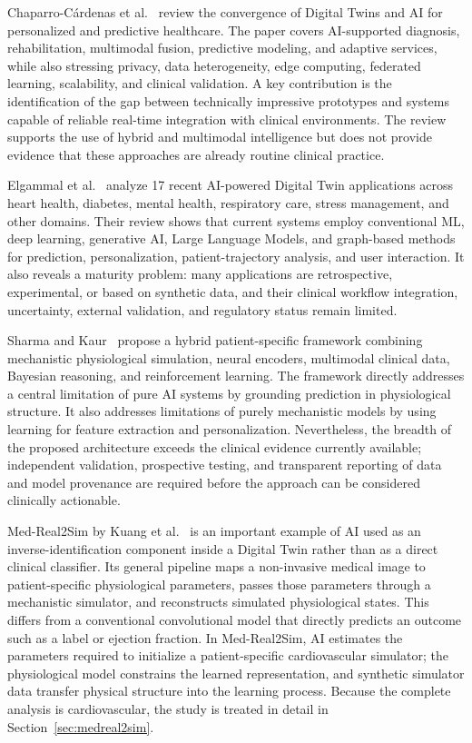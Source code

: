 Chaparro-C\'ardenas et al.~\cite{chaparro2025technological} review the convergence of Digital Twins and AI for personalized and predictive healthcare. The paper covers AI-supported diagnosis, rehabilitation, multimodal fusion, predictive modeling, and adaptive services, while also stressing privacy, data heterogeneity, edge computing, federated learning, scalability, and clinical validation. A key contribution is the identification of the gap between technically impressive prototypes and systems capable of reliable real-time integration with clinical environments. The review supports the use of hybrid and multimodal intelligence but does not provide evidence that these approaches are already routine clinical practice.

Elgammal et al.~\cite{elgammal2025digital} analyze 17 recent AI-powered Digital Twin applications across heart health, diabetes, mental health, respiratory care, stress management, and other domains. Their review shows that current systems employ conventional ML, deep learning, generative AI, Large Language Models, and graph-based methods for prediction, personalization, patient-trajectory analysis, and user interaction. It also reveals a maturity problem: many applications are retrospective, experimental, or based on synthetic data, and their clinical workflow integration, uncertainty, external validation, and regulatory status remain limited.

Sharma and Kaur~\cite{sharma2025patient} propose a hybrid patient-specific framework combining mechanistic physiological simulation, neural encoders, multimodal clinical data, Bayesian reasoning, and reinforcement learning. The framework directly addresses a central limitation of pure AI systems by grounding prediction in physiological structure. It also addresses limitations of purely mechanistic models by using learning for feature extraction and personalization. Nevertheless, the breadth of the proposed architecture exceeds the clinical evidence currently available; independent validation, prospective testing, and transparent reporting of data and model provenance are required before the approach can be considered clinically actionable.

Med-Real2Sim by Kuang et al.~\cite{kuang2024medreal2sim} is an important example of AI used as an inverse-identification component inside a Digital Twin rather than as a direct clinical classifier. Its general pipeline maps a non-invasive medical image to patient-specific physiological parameters, passes those parameters through a mechanistic simulator, and reconstructs simulated physiological states. This differs from a conventional convolutional model that directly predicts an outcome such as a label or ejection fraction. In Med-Real2Sim, AI estimates the parameters required to initialize a patient-specific cardiovascular simulator; the physiological model constrains the learned representation, and synthetic simulator data transfer physical structure into the learning process. Because the complete analysis is cardiovascular, the study is treated in detail in Section~\ref{sec:medreal2sim}.

